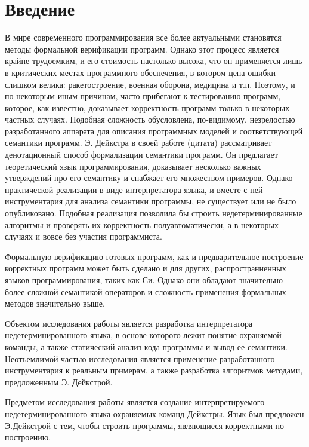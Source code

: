 \chapter*{Введение} %
В мире современного программирования все более актуальными становятся методы формальной верификации программ. Однако
этот процесс является крайне трудоемким, и его стоимость настолько высока, что он применяется лишь 
в критических местах программного обеспечения, в котором цена ошибки слишком велика: ракетостроение, военная оборона,
медицина и т.п. Поэтому, и по некоторым иным причинам, часто прибегают к тестированию программ, которое, как известно,
доказывает корректность программ только в некоторых частных случаях.
Подобная сложность обусловлена, по-видимому, незрелостью разработанного аппарата для описания программных моделей
и соответствующей семантики программ. Э. Дейкстра в своей работе (цитата) рассматривает денотационный способ формализации семантики программ.
Он предлагает теоретический язык программирования, доказывает несколько важных утверждений про его семантику и снабжает
его множеством примеров. Однако практической реализации в виде интерпретатора языка, и вместе с ней -- инструментария для 
анализа семантики программы, не существует или не было опубликовано. Подобная реализация позволила бы строить недетерминированные алгоритмы и
проверять их корректность полуавтоматически, а в некоторых случаях и вовсе без участия программиста.

Формальную верификацию готовых программ, как и предварительное построение корректных программ может быть сделано и для
других, распространненных языков программирования, таких как Си. Однако они обладают значительно более сложной семантикой
операторов и сложность применения формальных методов значительно выше.

Объектом исследования работы является разработка интерпретатора недетерминированного языка, в основе которого лежит понятие охраняемой команды,
а также статический анализ кода программы и вывод ее семантики. Неотъемлимой частью исследования является применение
разработанного инструментария к реальным примерам, а также разработка алгоритмов методами, предложенным Э. Дейкстрой.

Предметом исследования работы является создание интерпретируемого недетерминированного языка
охраняемых команд Дейкстры. Язык был предложен Э.Дейкстрой с тем, чтобы строить программы, являющиеся корректными по построению. 

